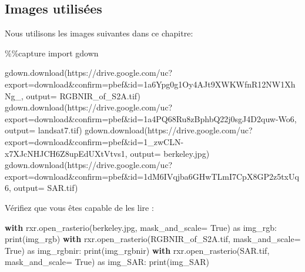 \documentclass[
  french,
  11pt,
  letterpaper,
  open=any,
  twoside=false,
  french]{scrbook}
\newenvironment{Shaded}{\begin{snugshade}}{\end{snugshade}}
\newcommand{\BuiltInTok}[1]{\textcolor[rgb]{0.00,0.23,0.31}{#1}}
\newcommand{\ControlFlowTok}[1]{\textcolor[rgb]{0.00,0.23,0.31}{\textbf{#1}}}
\newcommand{\ImportTok}[1]{\textcolor[rgb]{0.00,0.46,0.62}{#1}}
\newcommand{\NormalTok}[1]{\textcolor[rgb]{0.00,0.23,0.31}{#1}}
\newcommand{\OperatorTok}[1]{\textcolor[rgb]{0.37,0.37,0.37}{#1}}
\newcommand{\StringTok}[1]{\textcolor[rgb]{0.13,0.47,0.30}{#1}}
\newcommand{\VariableTok}[1]{\textcolor[rgb]{0.07,0.07,0.07}{#1}}
\begin{document}
\subsection{Images utilisées}\label{images-utilisuxe9es-1}

Nous utilisons les images suivantes dans ce chapitre:

\begin{Shaded}
\begin{Highlighting}[]
\OperatorTok{\%\%}\NormalTok{capture}
\ImportTok{import}\NormalTok{ gdown}

\NormalTok{gdown.download(}\StringTok{\textquotesingle{}https://drive.google.com/uc?export=download\&confirm=pbef\&id=1a6Ypg0g1Oy4AJt9XWKWfnR12NW1XhNg\_\textquotesingle{}}\NormalTok{, output}\OperatorTok{=} \StringTok{\textquotesingle{}RGBNIR\_of\_S2A.tif\textquotesingle{}}\NormalTok{)}
\NormalTok{gdown.download(}\StringTok{\textquotesingle{}https://drive.google.com/uc?export=download\&confirm=pbef\&id=1a4PQ68Ru8zBphbQ22j0sgJ4D2quw{-}Wo6\textquotesingle{}}\NormalTok{, output}\OperatorTok{=} \StringTok{\textquotesingle{}landsat7.tif\textquotesingle{}}\NormalTok{)}
\NormalTok{gdown.download(}\StringTok{\textquotesingle{}https://drive.google.com/uc?export=download\&confirm=pbef\&id=1\_zwCLN{-}x7XJcNHJCH6Z8upEdUXtVtvs1\textquotesingle{}}\NormalTok{, output}\OperatorTok{=} \StringTok{\textquotesingle{}berkeley.jpg\textquotesingle{}}\NormalTok{)}
\NormalTok{gdown.download(}\StringTok{\textquotesingle{}https://drive.google.com/uc?export=download\&confirm=pbef\&id=1dM6IVqjba6GHwTLmI7CpX8GP2z5txUq6\textquotesingle{}}\NormalTok{, output}\OperatorTok{=} \StringTok{\textquotesingle{}SAR.tif\textquotesingle{}}\NormalTok{)}
\end{Highlighting}
\end{Shaded}

Vérifiez que vous êtes capable de les lire :

\begin{Shaded}
\begin{Highlighting}[]
\ControlFlowTok{with}\NormalTok{ rxr.open\_rasterio(}\StringTok{\textquotesingle{}berkeley.jpg\textquotesingle{}}\NormalTok{, mask\_and\_scale}\OperatorTok{=} \VariableTok{True}\NormalTok{) }\ImportTok{as}\NormalTok{ img\_rgb:}
    \BuiltInTok{print}\NormalTok{(img\_rgb)}
\ControlFlowTok{with}\NormalTok{ rxr.open\_rasterio(}\StringTok{\textquotesingle{}RGBNIR\_of\_S2A.tif\textquotesingle{}}\NormalTok{, mask\_and\_scale}\OperatorTok{=} \VariableTok{True}\NormalTok{) }\ImportTok{as}\NormalTok{ img\_rgbnir:}
    \BuiltInTok{print}\NormalTok{(img\_rgbnir)}
\ControlFlowTok{with}\NormalTok{ rxr.open\_rasterio(}\StringTok{\textquotesingle{}SAR.tif\textquotesingle{}}\NormalTok{, mask\_and\_scale}\OperatorTok{=} \VariableTok{True}\NormalTok{) }\ImportTok{as}\NormalTok{ img\_SAR:}
    \BuiltInTok{print}\NormalTok{(img\_SAR)}
\end{Highlighting}
\end{Shaded}
\end{document}
